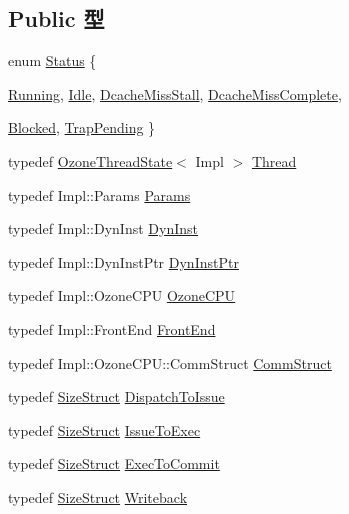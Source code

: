 \subsection*{Public 型}
\begin{DoxyCompactItemize}
\item 
enum \hyperlink{classLWBackEnd_a67a0db04d321a74b7e7fcfd3f1a3f70b}{Status} \{ \par
\hyperlink{classLWBackEnd_a67a0db04d321a74b7e7fcfd3f1a3f70ba2f5f2c4a8c4f4f0519d503dcdfbf55cb}{Running}, 
\hyperlink{classLWBackEnd_a67a0db04d321a74b7e7fcfd3f1a3f70bad3fa9ae9431d6cb1772f9d9df48cab19}{Idle}, 
\hyperlink{classLWBackEnd_a67a0db04d321a74b7e7fcfd3f1a3f70ba4ba5ae5815b190bd652669e2fdea5ed7}{DcacheMissStall}, 
\hyperlink{classLWBackEnd_a67a0db04d321a74b7e7fcfd3f1a3f70ba1eb81f4540c1c4b90839b08ae63c5d7f}{DcacheMissComplete}, 
\par
\hyperlink{classLWBackEnd_a67a0db04d321a74b7e7fcfd3f1a3f70ba9463ee9b8700258a1019b4b9d2d77a30}{Blocked}, 
\hyperlink{classLWBackEnd_a67a0db04d321a74b7e7fcfd3f1a3f70ba8c49adf6da5f507150d403610c684877}{TrapPending}
 \}
\item 
typedef \hyperlink{structOzoneThreadState}{OzoneThreadState}$<$ Impl $>$ \hyperlink{classLWBackEnd_a9311aca87e8229ec3f7a7422ccbc9fbe}{Thread}
\item 
typedef Impl::Params \hyperlink{classLWBackEnd_a818e103eae798a24a06a0a34631849ea}{Params}
\item 
typedef Impl::DynInst \hyperlink{classLWBackEnd_ab741745c86a14c765b999c11167636d9}{DynInst}
\item 
typedef Impl::DynInstPtr \hyperlink{classLWBackEnd_a028ce10889c5f6450239d9e9a7347976}{DynInstPtr}
\item 
typedef Impl::OzoneCPU \hyperlink{classLWBackEnd_a9730cc41bccb218cae8f32869b8d887e}{OzoneCPU}
\item 
typedef Impl::FrontEnd \hyperlink{classLWBackEnd_abe8e1d8243582d5024a1076f6091d9fe}{FrontEnd}
\item 
typedef Impl::OzoneCPU::CommStruct \hyperlink{classLWBackEnd_abdf3026ccc30c2ed3cb77dbe3cfbacad}{CommStruct}
\item 
typedef \hyperlink{structLWBackEnd_1_1SizeStruct}{SizeStruct} \hyperlink{classLWBackEnd_a99d236038ce57aa3ef78858228c5f972}{DispatchToIssue}
\item 
typedef \hyperlink{structLWBackEnd_1_1SizeStruct}{SizeStruct} \hyperlink{classLWBackEnd_a5badfe54e71b8fccb3d371013a8eef73}{IssueToExec}
\item 
typedef \hyperlink{structLWBackEnd_1_1SizeStruct}{SizeStruct} \hyperlink{classLWBackEnd_a91ea582041466725b4b17ce19f98685f}{ExecToCommit}
\item 
typedef \hyperlink{structLWBackEnd_1_1SizeStruct}{SizeStruct} \hyperlink{classLWBackEnd_a20d1fb15b536d49c687dee42d95c1a87}{Writeback}
\end{DoxyCompactItemize}
